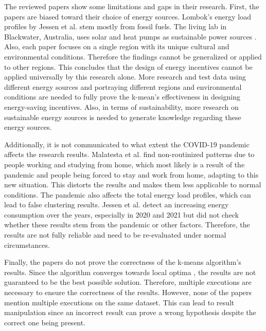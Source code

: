 The reviewed papers show some limitations and gaps in their research.
First, the papers are biased toward their choice of energy sources.
Lombok's energy load profiles by Jessen et al. \cite{JES-IND} stem mostly from fossil fuels.
The living lab in Blackwater, Australia, uses solar and heat pumps as sustainable power sources \cite{MAL-HBP}.
Also, each paper focuses on a single region with its unique cultural and environmental conditions.
Therefore the findings cannot be generalized or applied to other regions.
This concludes that the design of energy incentives cannot be applied universally by this research alone.
More research and test data using different energy sources and portraying different regions and environmental conditions are needed to fully prove the k-mean's effectiveness in designing energy-saving incentives. 
Also, in terms of sustainability, more research on sustainable energy sources is needed to generate knowledge regarding these energy sources.

Additionally, it is not communicated to what extent the COVID-19 pandemic affects the research results.
Malatesta et al. \cite{MAL-HBP} find non-routinized patterns due to people working and studying from home, which most likely is a result of the pandemic and people being forced to stay and work from home, adapting to this new situation.
This distorts the results and makes them less applicable to normal conditions.
The pandemic also affects the total energy load profiles, which can lead to false clustering results.
Jessen et al. \cite{JES-IND} detect an increasing energy consumption over the years, especially in 2020 and 2021 but did not check whether these results stem from the pandemic or other factors.
Therefore, the results are not fully reliable and need to be re-evaluated under normal circumstances.

Finally, the papers do not prove the correctness of the k-means algorithm's results.
Since the algorithm converges towards local optima \cite{SEL-GCT}, the results are not guaranteed to be the best possible solution.
Therefore, multiple executions are necessary to ensure the correctness of the results.
However, none of the papers mention multiple executions on the same dataset.
This can lead to result manipulation since an incorrect result can prove a wrong hypothesis despite the correct one being present.

